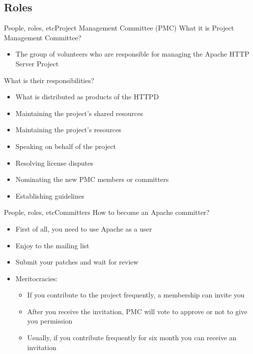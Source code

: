 \documentclass[10pt]{beamer}
\begin{document}
\subsection{Roles}
\begin{frame}{People, roles, etc}{Project Management Committee (PMC)}
  What it is Project Management Committee? \pause
  \begin{itemize}
    \item The group of volunteers who are responsible for managing the Apache
          HTTP Server Project \pause
  \end{itemize}

  What is their responsibilities? \pause
  \begin{itemize}
    \item What is distributed as products of the HTTPD \pause
    \item Maintaining the project's shared resources \pause
    \item Maintaining the project's resources \pause
    \item Speaking on behalf of the project \pause
    \item Resolving license disputes \pause
    \item Nominating the new PMC members or committers \pause
    \item Establishing guidelines
  \end{itemize}
\end{frame}

\begin{frame}{People, roles, etc}{Committers}
  How to become an Apache committer? \pause
  \begin{itemize}
    \item First of all, you need to use Apache as a user \pause
    \item Enjoy to the mailing list \pause
    \item Submit your patches and wait for review \pause
    \item Meritocracies:
    \begin{itemize}
      \item If you contribute to the project frequently, a membership can
            invite you \pause
      \item After you receive the invitation, PMC will vote to approve or not
            to give you permission \pause
      \item Usually, if you contribute frequently for six month you can receive
            an invitation
    \end{itemize}
  \end{itemize}
\end{frame}
\end{document}
